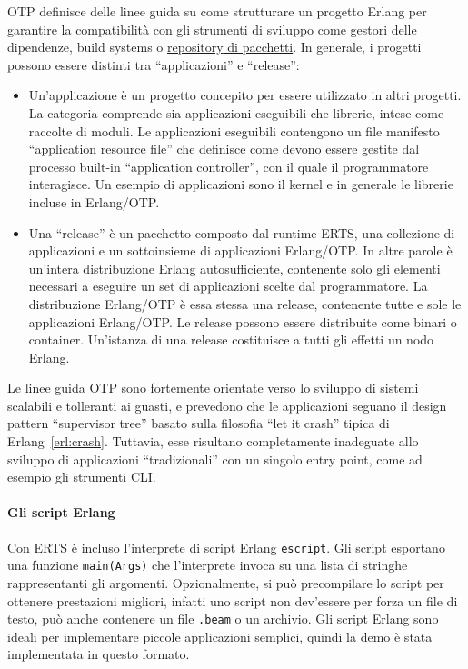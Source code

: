 \documentclass[target=bach,aauheader=,style=]{thud}
\newcommand{\eng}[1]{\foreignlanguage{english}{#1}}
\begin{document}
OTP definisce delle linee guida su come strutturare un progetto Erlang per garantire la compatibilità con gli strumenti di sviluppo come gestori delle dipendenze, \eng{build systems} o \href{https://hex.pm/}{\eng{repository} di pacchetti}. In generale, i progetti possono essere distinti tra ``applicazioni'' e ``release'':
\begin{itemize}
    \item Un'applicazione è un progetto concepito per essere utilizzato in altri progetti. La categoria comprende sia applicazioni eseguibili che librerie, intese come raccolte di moduli. Le applicazioni eseguibili contengono un file manifesto ``\eng{application resource file}'' che definisce come devono essere gestite dal processo \eng{built-in} ``\eng{application controller}'', con il quale il programmatore interagisce. Un esempio di applicazioni sono il \eng{kernel} e in generale le librerie incluse in Erlang/OTP.
    \item Una ``release'' è un pacchetto composto dal \eng{runtime} ERTS, una collezione di applicazioni e un sottoinsieme di applicazioni Erlang/OTP. In altre parole è un'intera distribuzione Erlang autosufficiente, contenente solo gli elementi necessari a eseguire un set di applicazioni scelte dal programmatore. La distribuzione Erlang/OTP è essa stessa una release, contenente tutte e sole le applicazioni Erlang/OTP. Le release possono essere distribuite come binari o container. Un'istanza di una release costituisce a tutti gli effetti un nodo Erlang.
\end{itemize}
Le linee guida OTP sono fortemente orientate verso lo sviluppo di sistemi scalabili e tolleranti ai guasti, e prevedono che le applicazioni seguano il design pattern ``\eng{supervisor tree}'' basato sulla filosofia ``\eng{let it crash}'' tipica di Erlang~\ref{erl:crash}. Tuttavia, esse risultano completamente inadeguate allo sviluppo di applicazioni ``tradizionali'' con un singolo \eng{entry point}, come ad esempio gli strumenti CLI.

\paragraph{Gli script Erlang}
Con ERTS è incluso l'interprete di script Erlang \lstinline{escript}. Gli script esportano una funzione \lstinline{main(Args)} che l'interprete invoca su una lista di stringhe rappresentanti gli argomenti. Opzionalmente, si può precompilare lo script per ottenere prestazioni migliori, infatti uno script non dev'essere per forza un file di testo, può anche contenere un file \lstinline{.beam} o un archivio. Gli script Erlang sono ideali per implementare piccole applicazioni semplici, quindi la demo è stata implementata in questo formato.
\bigskip
\end{document}
